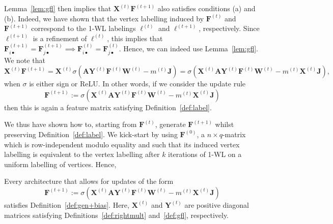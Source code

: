 Lemma~\ref{lem:gfl} then implies that $\mathbf{X}^{(t)}\mathbf{F}^{(t+1)}$ also satisfies conditions (a) and (b). Indeed, we have shown that the vertex labelling induced by $\mathbf{F}^{(t)}$ and $\mathbf{F}^{(t+1)}$ correspond to the 1-WL labelings $\ell^{(t)}$ and $\ell^{(t+1)}$, respectively.
Since $\ell^{(t+1)}$ is a refinement of $\ell^{(t)}$, this implies that $\mathbf{F}_{i\bullet}^{(t+1)}=\mathbf{F}_{j\bullet}^{(t+1)} \implies \mathbf{F}_{i\bullet}^{(t)}=\mathbf{F}_{j\bullet}^{(t)}$. Hence, we can indeed use Lemma~\ref{lem:gfl}.
We note that
$$
\mathbf{X}^{(t)}\mathbf{F}^{(t+1)}=\mathbf{X}^{(t)}\sigma(\mathbf{A}\mathbf{Y}^{(t)}\mathbf{F}^{(t)}\mathbf{W}^{(t)} - m^{(t)}\mathbf{J})=\sigma(\mathbf{X}^{(t)}\mathbf{A}\mathbf{Y}^{(t)}\mathbf{F}^{(t)}\mathbf{W}^{(t)} - m^{(t)}\mathbf{X}^{(t)}\mathbf{J}),
$$
when $\sigma$ is either sign or ReLU. In other words, if we consider the update rule
\begin{equation}
\mathbf{F}^{(t+1)}:=\sigma(\mathbf{X}^{(t)}\mathbf{A}\mathbf{Y}^{(t)}\mathbf{F}^{(t)}\mathbf{W}^{(t)} - m^{(t)}\mathbf{X}^{(t)}\mathbf{J}) \label{eq:realfinalupd}
\end{equation}
then this is again a feature matrix satisfying Definition~\ref{def:label}.

We thus have shown how to, starting from $\mathbf{F}^{(t)}$, generate $\mathbf{F}^{(t+1)}$ whilst preserving Definition~\ref{def:label}. We kick-start by using $\mathbf{F}^{(0)}$, a $n\times q$-matrix which is row-independent modulo equality and
such that its induced vertex labelling is equivalent to the vertex labelling after $k$ iterations of 1-WL on a uniform labelling of vertices. Hence,

\begin{proposition}\label{pro:gen+bias}
Every architecture that allows for updates of the form
$$\mathbf{F}^{(t+1)}:=\sigma(\mathbf{X}^{(t)}\mathbf{A}\mathbf{Y}^{(t)}\mathbf{F}^{(t)}\mathbf{W}^{(t)} - m^{(t)}\mathbf{X}^{(t)}\mathbf{J}) $$
satisfies Definition~\ref{def:gen+bias}.
Here, $\mathbf{X}^{(t)}$ and $\mathbf{Y}^{(t)}$ are positive diagonal matrices satisfying Definitions~\ref{def:rightmult} and~\ref{def:gfl}, respectively. 
\end{proposition}


